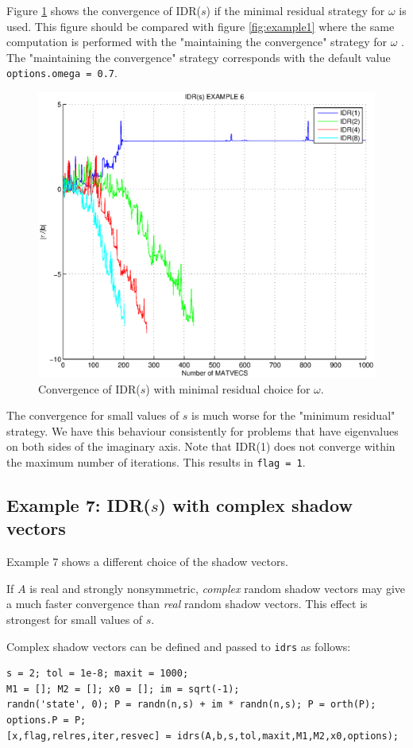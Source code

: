 \documentclass[prodmode,acmtoms]{acmsmall}
\begin{document}
Figure \ref{fig:example6} shows the convergence of IDR($s$) if the minimal residual strategy for $\omega$ is used.
This figure should be compared with figure \ref{fig:example1} where the same computation is performed with the
"maintaining the convergence" strategy for $\omega$ \cite{maintaining,idrs_biortho}. The 
"maintaining the convergence" strategy corresponds with the default value {\tt options.omega = 0.7}.
\begin{figure}
\centering
\includegraphics[width=.60\linewidth]{example6}
\caption{Convergence of IDR($s$) with minimal residual choice for $\omega$.}
\label{fig:example6}
\end{figure}
The convergence for small values of $s$ is much worse for the "minimum residual" strategy. We have this behaviour 
consistently for problems that have eigenvalues on both sides of the imaginary axis. Note that IDR(1) does
not converge within the maximum number of iterations. This results in {\tt flag = 1}.

\subsection{Example 7: IDR($s$) with complex shadow vectors}
Example 7 shows a different choice of the shadow vectors.

If $A$ is real and strongly nonsymmetric, \emph{complex} random shadow vectors may give a much faster convergence 
than \emph{real} random shadow vectors. This effect is strongest for small values of $s$. 

Complex shadow vectors can be defined and passed to {\tt idrs} as follows:
\begin{verbatim}
s = 2; tol = 1e-8; maxit = 1000;
M1 = []; M2 = []; x0 = []; im = sqrt(-1);
randn('state', 0); P = randn(n,s) + im * randn(n,s); P = orth(P); options.P = P;
[x,flag,relres,iter,resvec] = idrs(A,b,s,tol,maxit,M1,M2,x0,options);
\end{verbatim}
\end{document}
